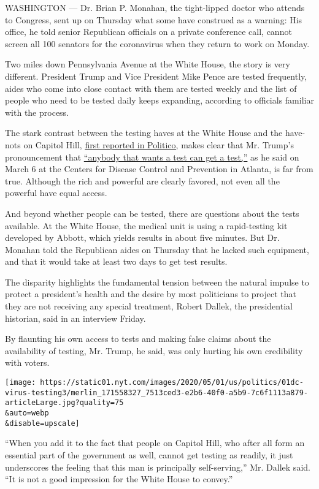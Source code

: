WASHINGTON --- Dr. Brian P. Monahan, the tight-lipped doctor who attends
to Congress, sent up on Thursday what some have construed as a warning:
His office, he told senior Republican officials on a private conference
call, cannot screen all 100 senators for the coronavirus when they
return to work on Monday.

Two miles down Pennsylvania Avenue at the White House, the story is very
different. President Trump and Vice President Mike Pence are tested
frequently, aides who come into close contact with them are tested
weekly and the list of people who need to be tested daily keeps
expanding, according to officials familiar with the process.

The stark contrast between the testing haves at the White House and the
have-nots on Capitol Hill,
\href{https://www.politico.com/news/2020/04/30/capitol-physician-senators-coronavirus-testing-226980}{first
reported in Politico,} makes clear that Mr. Trump's pronouncement that
\href{https://www.youtube.com/watch?v=ndojafDR2fI\&feature=youtu.be\&t=5389}{``anybody
that wants a test can get a test,''} as he said on March 6 at the
Centers for Disease Control and Prevention in Atlanta, is far from true.
Although the rich and powerful are clearly favored, not even all the
powerful have equal access.

And beyond whether people can be tested, there are questions about the
tests available. At the White House, the medical unit is using a
rapid-testing kit developed by Abbott, which yields results in about
five minutes. But Dr. Monahan told the Republican aides on Thursday that
he lacked such equipment, and that it would take at least two days to
get test results.

The disparity highlights the fundamental tension between the natural
impulse to protect a president's health and the desire by most
politicians to project that they are not receiving any special
treatment, Robert Dallek, the presidential historian, said in an
interview Friday.

By flaunting his own access to tests and making false claims about the
availability of testing, Mr. Trump, he said, was only hurting his own
credibility with voters.

\texttt{[image: https://static01.nyt.com/images/2020/05/01/us/politics/01dc-virus-testing3/merlin\_171558327\_7513ced3-e2b6-40f0-a5b9-7c6f1113a879-articleLarge.jpg?quality=75\\\&auto=webp\\\&disable=upscale]}

``When you add it to the fact that people on Capitol Hill, who after all
form an essential part of the government as well, cannot get testing as
readily, it just underscores the feeling that this man is principally
self-serving,'' Mr. Dallek said. ``It is not a good impression for the
White House to convey.''

